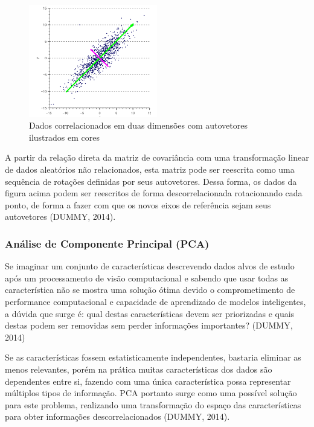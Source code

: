 \documentclass[12pt]{report}
\begin{document}
\begin{figure}
    \centering
    \includegraphics[width=0.5\textwidth]{images/correlated_2d.png}
    \caption{Dados correlacionados em duas dimensões com autovetores ilustrados em cores}
    \label{fig:corr_2d}
\end{figure}

A partir da relação direta da matriz de covariância com uma transformação linear de dados aleatórios não relacionados, esta matriz pode ser reescrita como uma sequência de rotações definidas por seus autovetores. Dessa forma, os dados da figura acima podem ser reescritos de forma descorrelacionada rotacionando cada ponto, de forma a fazer com que os novos eixos de referência sejam seus autovetores (DUMMY, 2014). 

\subsubsection{Análise de Componente Principal (PCA)}

Se imaginar um conjunto de características descrevendo dados alvos de estudo após um processamento de visão computacional e sabendo que usar todas as característica não se mostra uma solução ótima devido o comprometimento de performance computacional e capacidade de aprendizado de modelos inteligentes, a dúvida que surge é: qual destas características devem ser priorizadas e quais destas podem ser removidas sem perder informações importantes? (DUMMY, 2014) 

Se as características fossem estatisticamente independentes, bastaria eliminar as menos relevantes, porém na prática muitas características dos dados são dependentes entre si, fazendo com uma única característica possa representar múltiplos tipos de informação. PCA portanto surge como uma possível solução para este problema, realizando uma transformação do espaço das características para obter informações descorrelacionados (DUMMY, 2014).
\end{document}
